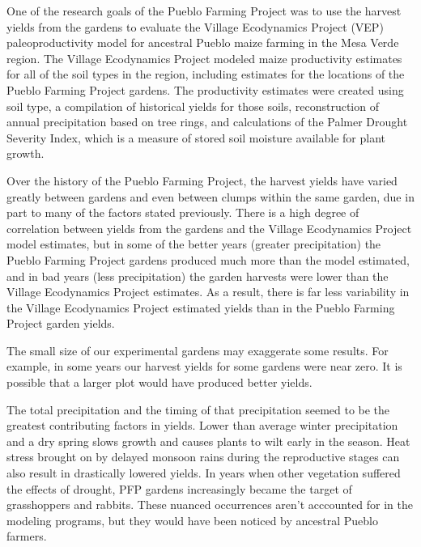 \documentclass[12pt,]{article}
\begin{document}
One of the research goals of the Pueblo Farming Project was to use the harvest yields from the gardens to evaluate the Village Ecodynamics Project (VEP) paleoproductivity model for ancestral Pueblo maize farming in the Mesa Verde region. The Village Ecodynamics Project modeled maize productivity estimates for all of the soil types in the region, including estimates for the locations of the Pueblo Farming Project gardens. The productivity estimates were created using soil type, a compilation of historical yields for those soils, reconstruction of annual precipitation based on tree rings, and calculations of the Palmer Drought Severity Index, which is a measure of stored soil moisture available for plant growth.

Over the history of the Pueblo Farming Project, the harvest yields have varied greatly between gardens and even between clumps within the same garden, due in part to many of the factors stated previously. There is a high degree of correlation between yields from the gardens and the Village Ecodynamics Project model estimates, but in some of the better years (greater precipitation) the Pueblo Farming Project gardens produced much more than the model estimated, and in bad years (less precipitation) the garden harvests were lower than the Village Ecodynamics Project estimates. As a result, there is far less variability in the Village Ecodynamics Project estimated yields than in the Pueblo Farming Project garden yields.

The small size of our experimental gardens may exaggerate some results. For example, in some years our harvest yields for some gardens were near zero. It is possible that a larger plot would have produced better yields.

The total precipitation and the timing of that precipitation seemed to be the greatest contributing factors in yields. Lower than average winter precipitation and a dry spring slows growth and causes plants to wilt early in the season. Heat stress brought on by delayed monsoon rains during the reproductive stages can also result in drastically lowered yields. In years when other vegetation suffered the effects of drought, PFP gardens increasingly became the target of grasshoppers and rabbits. These nuanced occurrences aren't acccounted for in the modeling programs, but they would have been noticed by ancestral Pueblo farmers.
\end{document}
